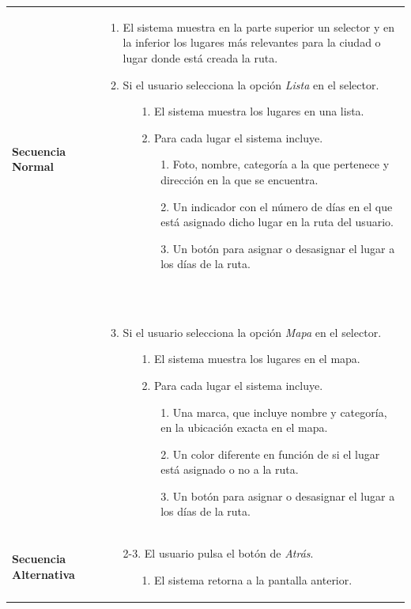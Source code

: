 \begin{longtable}{| p{4cm} | p{10cm} |}
\hline
\textbf{Secuencia Normal} &\mbox{}\par\vspace{-\baselineskip}
\begin{enumerate}[leftmargin=0.7cm, topsep=0.1cm]
\item El sistema muestra en la parte superior un selector y en la inferior los lugares más relevantes para la ciudad o lugar donde está creada la ruta.
\item Si el usuario selecciona la opción \textit{Lista} en el selector.
	\begin{itemize}
	\item[1.] El sistema muestra los lugares en una lista.
	\item[2.] Para cada lugar el sistema incluye.
		\begin{itemize}
		\item[1.] Foto, nombre, categoría a la que pertenece y dirección en la que se encuentra.
		\item[2.] Un indicador con el número de días en el que está asignado dicho lugar en la ruta del usuario.
		\item[3.] Un botón para asignar o desasignar el lugar a los días de la ruta.
		\end{itemize}
	\end{itemize}
\end{enumerate}
\ \\&
\begin{enumerate}[leftmargin=0.7cm, topsep=0.1cm]
\setcounter{enumi}{2}
\item Si el usuario selecciona la opción \textit{Mapa} en el selector.
	\begin{itemize}
	\item[1.] El sistema muestra los lugares en el mapa.
	\item[2.] Para cada lugar el sistema incluye.
		\begin{itemize}
		\item[1.] Una marca, que incluye nombre y categoría, en la ubicación exacta en el mapa.
		\item[2.] Un color diferente en función de si el lugar está asignado o no a la ruta.
		\item[3.] Un botón para asignar o desasignar el lugar a los días de la ruta.
		\end{itemize}
	\end{itemize}
\end{enumerate}


\\
\hline
\textbf{Secuencia Alternativa} &\mbox{}\par\vspace{-\baselineskip}
\begin{enumerate}[leftmargin=0.9cm, topsep=0.1cm]
\item[2-3.] El usuario pulsa el botón de \textit{Atrás}.
	\begin{itemize}
	\item[1.] El sistema retorna a la pantalla anterior.
	\end{itemize}
\end{enumerate}
\\


\end{longtable}

